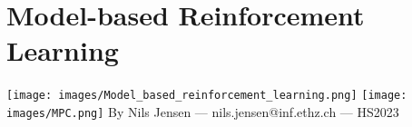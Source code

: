 \section{Model-based Reinforcement Learning}

\texttt{[image: images/Model\_based\_reinforcement\_learning.png]}
\texttt{[image: images/MPC.png]}
By Nils Jensen --- nils.jensen@inf.ethz.ch --- HS2023
